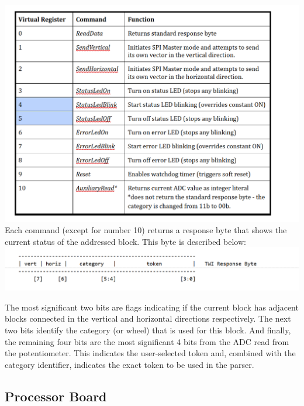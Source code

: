 \documentclass[12pt,a4paper]{article}
\begin{document}
  \includegraphics[width=6.5in]{vrc.png}
  Each command (except for number 10) returns a response byte that shows the current status of the addressed block. This byte is described below:
    \includegraphics[width=6.5in]{TWI.png}
    
    \newpage
    The most significant two bits are flags indicating if the current block has adjacent blocks connected in the vertical and horizontal directions respectively. The next two bits identify the category (or wheel) that is used for this block. And finally, the remaining four bits are the most significant 4 bits from the ADC read from the potentiometer. This indicates the user-selected token and, combined with the category identifier, indicates the exact token to be used in the parser. 
    
    \subsection{Processor Board}
\end{document}

